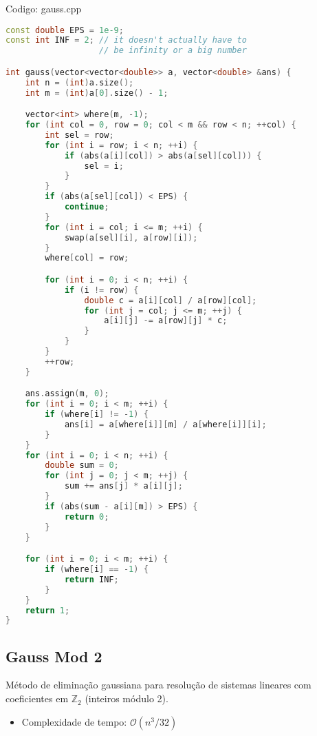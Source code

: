 \documentclass[10pt, a4paper, oneside]{book}
\begin{document}
\hfill

Codigo: gauss.cpp

\begin{lstlisting}[language=C++]
const double EPS = 1e-9;
const int INF = 2; // it doesn't actually have to
                   // be infinity or a big number

int gauss(vector<vector<double>> a, vector<double> &ans) {
    int n = (int)a.size();
    int m = (int)a[0].size() - 1;

    vector<int> where(m, -1);
    for (int col = 0, row = 0; col < m && row < n; ++col) {
        int sel = row;
        for (int i = row; i < n; ++i) {
            if (abs(a[i][col]) > abs(a[sel][col])) {
                sel = i;
            }
        }
        if (abs(a[sel][col]) < EPS) {
            continue;
        }
        for (int i = col; i <= m; ++i) {
            swap(a[sel][i], a[row][i]);
        }
        where[col] = row;

        for (int i = 0; i < n; ++i) {
            if (i != row) {
                double c = a[i][col] / a[row][col];
                for (int j = col; j <= m; ++j) {
                    a[i][j] -= a[row][j] * c;
                }
            }
        }
        ++row;
    }

    ans.assign(m, 0);
    for (int i = 0; i < m; ++i) {
        if (where[i] != -1) {
            ans[i] = a[where[i]][m] / a[where[i]][i];
        }
    }
    for (int i = 0; i < n; ++i) {
        double sum = 0;
        for (int j = 0; j < m; ++j) {
            sum += ans[j] * a[i][j];
        }
        if (abs(sum - a[i][m]) > EPS) {
            return 0;
        }
    }

    for (int i = 0; i < m; ++i) {
        if (where[i] == -1) {
            return INF;
        }
    }
    return 1;
}
\end{lstlisting}
\hfill

\subsection{Gauss Mod 2}


Método de eliminação gaussiana para resolução de sistemas lineares com coeficientes em $\mathbb{Z}_2$ (inteiros módulo 2).



\begin{itemize}
\item Complexidade de tempo: $\mathcal{O}(n^3/32)$
\end{itemize}
\end{document}
